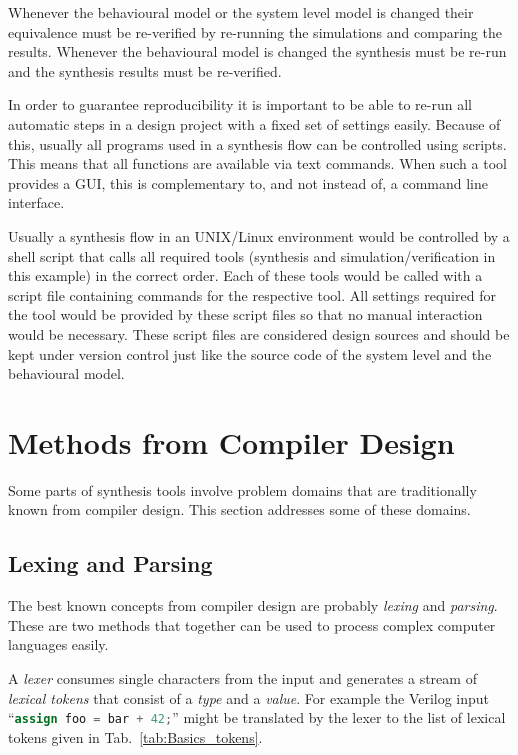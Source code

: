 Whenever the behavioural model or the system level model is
changed their equivalence must be re-verified by re-running the simulations
and comparing the results. Whenever the behavioural model is changed the
synthesis must be re-run and the synthesis results must be re-verified.

In order to guarantee reproducibility it is important to be able to re-run all
automatic steps in a design project with a fixed set of settings easily.
Because of this, usually all programs used in a synthesis flow can be
controlled using scripts. This means that all functions are available via
text commands. When such a tool provides a GUI, this is complementary to,
and not instead of, a command line interface.

Usually a synthesis flow in an UNIX/Linux environment would be controlled by a
shell script that calls all required tools (synthesis and simulation/verification
in this example) in the correct order. Each of these tools would be called with
a script file containing commands for the respective tool. All settings required
for the tool would be provided by these script files so that no manual interaction
would be necessary. These script files are considered design sources and should
be kept under version control just like the source code of the system level and the
behavioural model.

\section{Methods from Compiler Design}

Some parts of synthesis tools involve problem domains that are traditionally known from
compiler design. This section addresses some of these domains.

\subsection{Lexing and Parsing}

The best known concepts from compiler design are probably {\it lexing} and {\it parsing}.
These are two methods that together can be used to process complex computer languages
easily. \cite{Dragonbook}

A {\it lexer} consumes single characters from the input and generates a stream of {\it lexical
tokens} that consist of a {\it type} and a {\it value}. For example the Verilog input
``\lstinline[language=Verilog]{assign foo = bar + 42;}'' might be translated by the lexer
to the list of lexical tokens given in Tab.~\ref{tab:Basics_tokens}.

